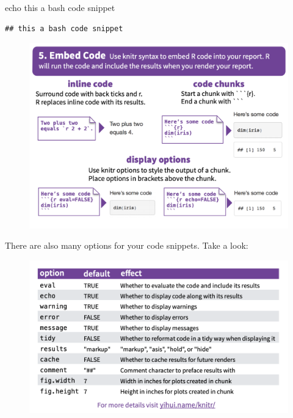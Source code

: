 \documentclass[]{book}
\newenvironment{Shaded}{\begin{snugshade}}{\end{snugshade}}
\newcommand{\BuiltInTok}[1]{#1}
\newcommand{\NormalTok}[1]{#1}
\begin{document}
\begin{Shaded}
\begin{Highlighting}[]
\BuiltInTok{echo}\NormalTok{ this a bash code snippet}
\end{Highlighting}
\end{Shaded}

\begin{verbatim}
## this a bash code snippet
\end{verbatim}

\begin{figure}
\centering
\includegraphics{images/code.png}
\caption{}
\end{figure}

There are also many options for your code snippets. Take a look:

\begin{figure}
\centering
\includegraphics{images/options.png}
\caption{}
\end{figure}
\end{document}
